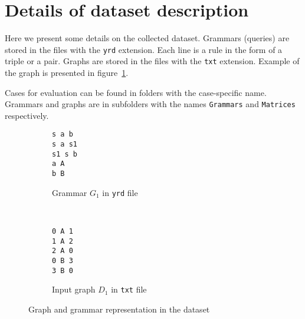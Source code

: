 \section{Details of dataset description}

Here we present some details on the collected dataset.
Grammars (queries) are stored in the files with the \verb|yrd| extension.
Each line is a rule in the form of a triple or a pair.
Graphs are stored in the files with the \verb|txt| extension.
Example of the graph is presented in figure~\ref{fig:graph_example}.

Cases for evaluation can be found in folders with the case-specific name.
Grammars and graphs are in subfolders with the names \verb|Grammars| and \verb|Matrices| respectively.

\begin{figure}[h!]
    \centering
    \begin{subfigure}[b]{0.18\textwidth}
        \centering
        \begin{verbatim}
s a b
s a s1
s1 s b
a A
b B
        \end{verbatim}
        \caption{Grammar $G_1$ in \texttt{yrd} file}
    \end{subfigure}%
    ~\quad
    \begin{subfigure}[b]{0.20\textwidth}
        \centering
         \begin{verbatim}
0 A 1
1 A 2
2 A 0
0 B 3
3 B 0
 \end{verbatim}

        \caption{Input graph $D_1$ in \texttt{txt} file}
    \end{subfigure}
    \caption{Graph and grammar representation in the dataset}
    \label{fig:graph_example}
\end{figure}
